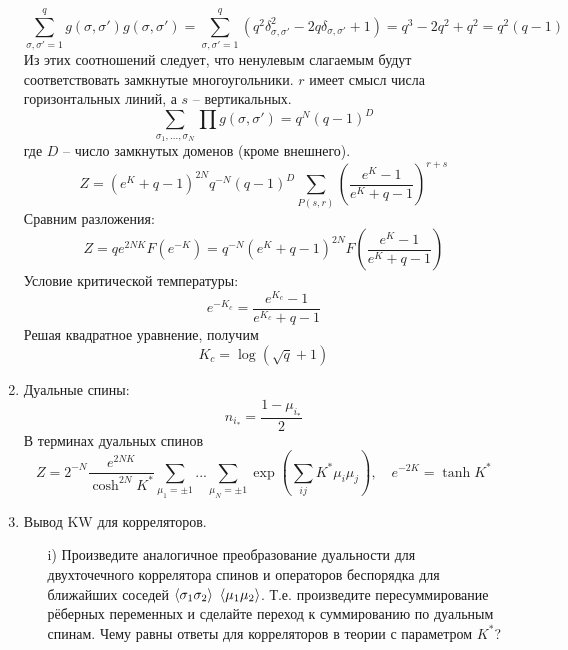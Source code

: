 \documentclass[12pt]{article}
\theoremstyle{definition}
\begin{document}
\begin{enumerate}
    \begin{equation}
        \sum\limits_{\sigma,\sigma'=1}^qg(\sigma,\sigma')g(\sigma,\sigma')=\sum\limits_{\sigma,\sigma'=1}^q(q^2\delta_{\sigma,\sigma'}^2-2q\delta_{\sigma,\sigma'}+1)=q^3-2q^2+q^2=q^2(q-1)
    \end{equation}
    Из этих соотношений следует, что ненулевым слагаемым будут соответствовать замкнутые многоугольники. $r$ имеет смысл числа горизонтальных линий, а $s$ -- вертикальных.
    \begin{equation}
        \sum\limits_{\sigma_1,...,\sigma_N}\prod g(\sigma,\sigma')=q^N(q-1)^D
    \end{equation}
    где $D$ -- число замкнутых доменов (кроме внешнего).
    \begin{equation}
        Z=({e^K+q-1})^{2N}q^{-N}(q-1)^D\sum\limits_{P(s,r)}\left(\frac{e^K-1}{e^K+q-1}\right)^{r+s}
    \end{equation}
    Сравним разложения:
    \begin{equation}
        \boxed{Z=qe^{2NK}F(e^{-K})=q^{-N}(e^K+q-1)^{2N}F\left(\frac{e^K-1}{e^K+q-1}\right)}
    \end{equation}
    Условие критической температуры:
    \begin{equation}
        e^{-K_c}=\frac{e^{K_c}-1}{e^{K_c}+q-1}
    \end{equation}
    Решая квадратное уравнение, получим
    \begin{equation}
        \boxed{K_c=\log(\sqrt{q}+1)}
    \end{equation}
    \item Дуальные спины:
        \begin{equation}
            n_{i_*}=\frac{1-\mu_{i_*}}{2}
        \end{equation}
        В терминах дуальных спинов 
        \begin{equation}
            Z=2^{-N}\frac{e^{2NK}}{\cosh^{2N}K^*}\sum\limits_{\mu_1=\pm1}...\sum\limits_{\mu_N=\pm1}\exp\left(\sum\limits_{ij}K^*\mu_i\mu_j\right),\quad e^{-2K}=\tanh K^*
        \end{equation}
    \item Вывод KW для корреляторов.
    \begin{itemize}
        \item[i)] Произведите аналогичное преобразование дуальности для двухточечного коррелятора спинов и операторов беспорядка для ближайших соседей $\braket{\sigma_1\sigma_2}$ $\braket{\mu_1\mu_2}$. Т.е. произведите пересуммирование рёберных переменных и сделайте переход к суммированию по дуальным спинам. Чему равны ответы для корреляторов в теории с параметром $K^*$?

\end{itemize}
\end{enumerate}
\end{document}
